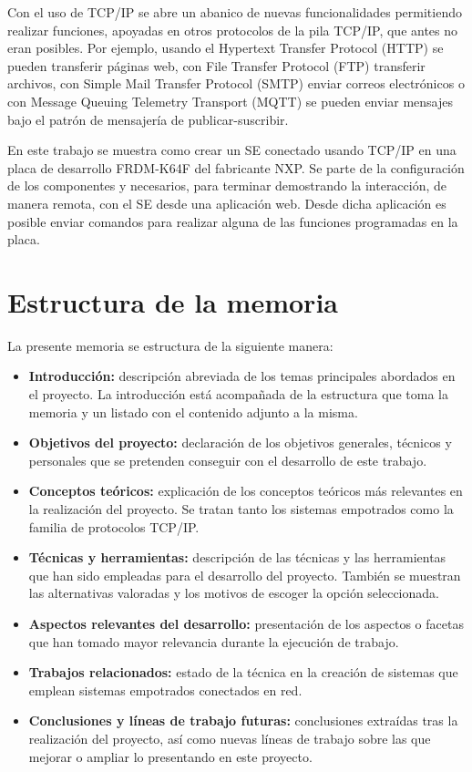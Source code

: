 Con el uso de TCP/IP se abre un abanico de nuevas funcionalidades permitiendo
realizar funciones, apoyadas en otros protocolos de la pila TCP/IP, que antes
no eran posibles. Por ejemplo, usando el Hypertext Transfer Protocol (HTTP) se
pueden transferir páginas web, con File Transfer Protocol (FTP) transferir
archivos, con Simple Mail Transfer Protocol (SMTP) enviar correos electrónicos
o con Message Queuing Telemetry Transport (MQTT) se pueden enviar
mensajes bajo el patrón de mensajería de publicar-suscribir.

En este trabajo se muestra como crear un SE conectado usando TCP/IP en una placa
de desarrollo FRDM-K64F del fabricante NXP. Se parte de la configuración de los
componentes  y  necesarios, para
terminar demostrando la interacción, de manera remota, con el SE desde una
aplicación web. Desde dicha aplicación es posible enviar comandos para realizar
alguna de las funciones programadas en la placa.

\section{Estructura de la memoria}\label{sec:estructura}
La presente memoria se estructura de la siguiente manera:

\begin{itemize}
\item
  \textbf{Introducción:} descripción abreviada de los temas principales 
  abordados en el proyecto. La introducción está acompañada de la estructura
  que toma la memoria y un listado con el contenido adjunto a la misma.
\item
  \textbf{Objetivos del proyecto:} declaración de los objetivos generales,
  técnicos y personales que se pretenden conseguir con el desarrollo de este
  trabajo.
\item
  \textbf{Conceptos teóricos:} explicación de los conceptos teóricos más
  relevantes en la realización del proyecto. Se tratan tanto los sistemas
  empotrados como la familia de protocolos TCP/IP.
\item
  \textbf{Técnicas y herramientas:} descripción de las técnicas y las
  herramientas que han sido empleadas para el desarrollo del proyecto. También
  se muestran las alternativas valoradas y los motivos de escoger la opción
  seleccionada.
\item
  \textbf{Aspectos relevantes del desarrollo:} presentación de los aspectos o
  facetas que han tomado mayor relevancia durante la ejecución de trabajo.
\item
  \textbf{Trabajos relacionados:} estado de la técnica en la creación de
  sistemas que emplean sistemas empotrados conectados en red.
\item
  \textbf{Conclusiones y líneas de trabajo futuras:} conclusiones extraídas tras
  la realización del proyecto, así como nuevas líneas de trabajo sobre las que
  mejorar o ampliar lo presentando en este proyecto.
\end{itemize}

